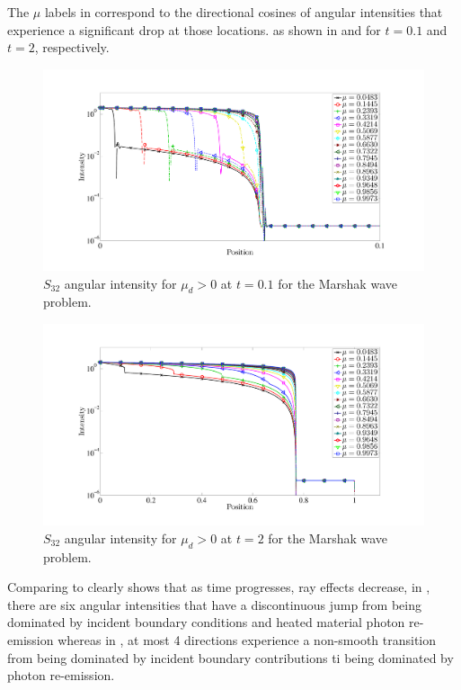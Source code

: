 The $\mu$ labels in  correspond to the directional cosines of angular intensities that experience a significant drop at those locations.
 as shown in  and  for $t=0.1$ and $t=2$, respectively.
\begin{figure}[!htp]
\centering
\includegraphics[width=17cm,trim=2in  0.5in 0.5in 0.75in,clip=true]{chapter6_grey_radtran/Dissertation_Data/S32_T01_Intensity.pdf}
\caption{$S_{32}$ angular intensity for $\mu_d>0$ at $t=0.1$ for the Marshak wave problem.}
\label{fig:t01_intensity}
\end{figure}
\begin{figure}[!hbp]
\centering
\includegraphics[width=17cm,trim=2in  0.4in 0.5in 0.75in,clip=true]{chapter6_grey_radtran/Dissertation_Data/S32_T2_Intensity.pdf}
\caption{$S_{32}$ angular intensity for $\mu_d>0$ at $t=2$ for the Marshak wave problem.}
\label{fig:t2_intensity}
\end{figure}
Comparing  to  clearly shows that as time progresses, ray effects decrease, in , there are six angular intensities that have a discontinuous jump from being dominated by incident boundary conditions and heated material photon re-emission whereas in , at most 4 directions experience a non-smooth transition from being dominated by incident boundary contributions ti being dominated by photon re-emission.

